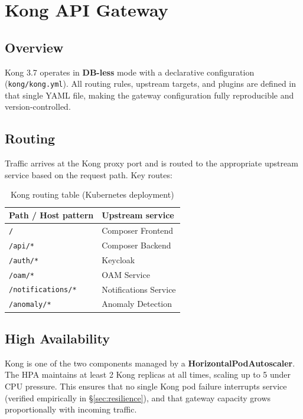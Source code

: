 \documentclass[12pt,a4paper,oneside]{report}
\begin{document}
\chapter{Kong API Gateway}
\label{ch:kong}

\section{Overview}

Kong 3.7 operates in \textbf{DB-less} mode with a declarative configuration (\texttt{kong/kong.yml}). All routing rules, upstream targets, and plugins are defined in that single YAML file, making the gateway configuration fully reproducible and version-controlled.

\section{Routing}

Traffic arrives at the Kong proxy port and is routed to the appropriate upstream service based on the request path. Key routes:

\begin{table}[H]
\centering
\caption{Kong routing table (Kubernetes deployment)}
\label{tab:kong-routes}
\renewcommand{\arraystretch}{1.3}
\begin{tabular}{l l}
\toprule
\textbf{Path / Host pattern} & \textbf{Upstream service} \\
\midrule
\texttt{/}                  & Composer Frontend \\
\texttt{/api/*}             & Composer Backend \\
\texttt{/auth/*}            & Keycloak \\
\texttt{/oam/*}             & OAM Service \\
\texttt{/notifications/*}   & Notifications Service \\
\texttt{/anomaly/*}         & Anomaly Detection \\
\bottomrule
\end{tabular}
\end{table}

\section{High Availability}

Kong is one of the two components managed by a \textbf{HorizontalPodAutoscaler}. The HPA maintains at least 2 Kong replicas at all times, scaling up to 5 under CPU pressure. This ensures that no single Kong pod failure interrupts service (verified empirically in §\ref{sec:resilience}), and that gateway capacity grows proportionally with incoming traffic.
\end{document}
